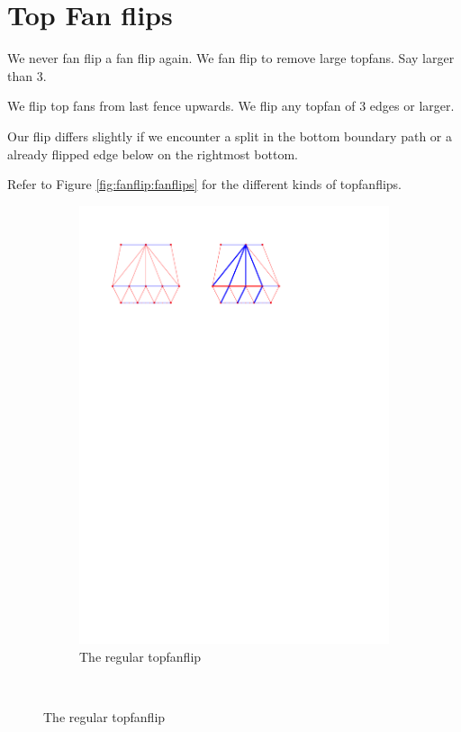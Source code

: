 
\section{Top Fan flips}

We never fan flip a fan flip again. We fan flip to remove large topfans. Say larger than 3.


We flip top fans from last fence upwards. We flip any topfan of 3 edges or larger.

Our flip differs slightly if we encounter a split in the bottom boundary path or a already flipped edge below on the rightmost bottom.

Refer to Figure \ref{fig:fanflip:fanflips} for the different kinds of topfanflips.


\begin{figure}
  \centering
  \begin{subfigure}[b]{0.8 \textwidth}
      \includegraphics[width = \textwidth]{topFanFlips/img/regular}
      \caption{The regular topfanflip}
  \end{subfigure}
  ~


\end{figure}
